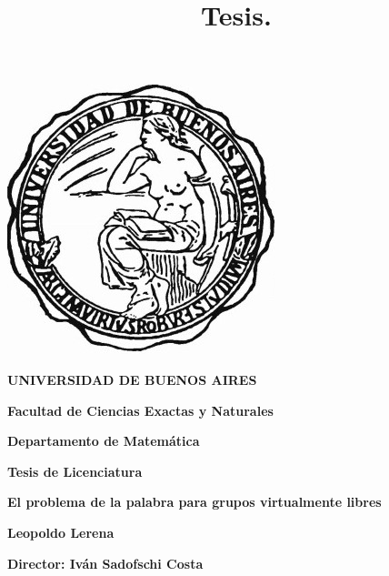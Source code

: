 \documentclass[10pt]{book}
\title{\color{red!55!black} Tesis.}
\date{}
\begin{document}
\thispagestyle{empty}

\begin {center}

\includegraphics[scale=.3]{LogoUBA.jpg}


\medskip
\textbf{\color{astral!40!black} UNIVERSIDAD DE BUENOS AIRES}

\smallskip

\textbf{\color{astral!40!black}Facultad de Ciencias Exactas y Naturales}

\smallskip

\textbf{\color{astral!40!black}Departamento de Matem\'atica}

\vspace{3.5cm}

\textbf{\large \color{astral!40!black} Tesis de Licenciatura}


\vspace{1.5cm}

\textbf{\large \color{astral!40!black} El problema de la palabra para grupos virtualmente libres}

\vspace{1.5cm}


\textbf{\color{astral!40!black} Leopoldo Lerena}

\end {center}


\vspace{1.5cm}

\noindent \textbf{\color{astral!40!black} Director:  Iván Sadofschi Costa}


\vspace{3cm}



\tableofcontents

\newpage
{}
\newpage




	




%



\end{document}
